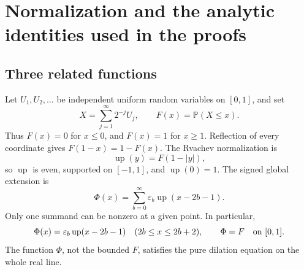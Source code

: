 \documentclass[11pt,a4paper]{article}
\theoremstyle{definition}
\theoremstyle{remark}
\newcommand{\Up}{\operatorname{up}}
\newcommand{\Pp}{\mathbb P}
\newcommand{\eps}{\varepsilon}
\begin{document}
\section{Normalization and the analytic identities used in the proofs}
\label{sec:foundation}
\subsection{Three related functions}
Let \(U_1,U_2,\ldots\) be independent uniform random variables on \([0,1]\), and set
\begin{equation}
 X=\sum_{j=1}^{\infty}2^{-j}U_j,\qquad
 F(x)=\Pp(X\leq x).                                      \label{eq:prob-F}
\end{equation}
Thus \(F(x)=0\) for \(x\leq0\), and \(F(x)=1\) for \(x\geq1\).
Reflection of every coordinate gives \(F(1-x)=1-F(x)\).
The Rvachev normalization is
\begin{equation}
 \Up(y)=F(1-|y|),                                        \label{eq:fold}
\end{equation}
so \(\Up\) is even, supported on \([-1,1]\), and \(\Up(0)=1\).
The signed global extension is
\begin{equation}
 \Phi(x)=\sum_{b=0}^{\infty}\eps_b\Up(x-2b-1).            \label{eq:Phi}
\end{equation}
Only one summand can be nonzero at a given point.  In particular,
\begin{equation}
 \Phi(x)=\eps_b\Up(x-2b-1)\quad(2b\leq x\leq2b+2),
 \qquad \Phi=F\quad\hbox{on }[0,1].                     \label{eq:block-fold}
\end{equation}
The function \(\Phi\), not the bounded \(F\), satisfies the pure dilation equation
on the whole real line.
\end{document}
